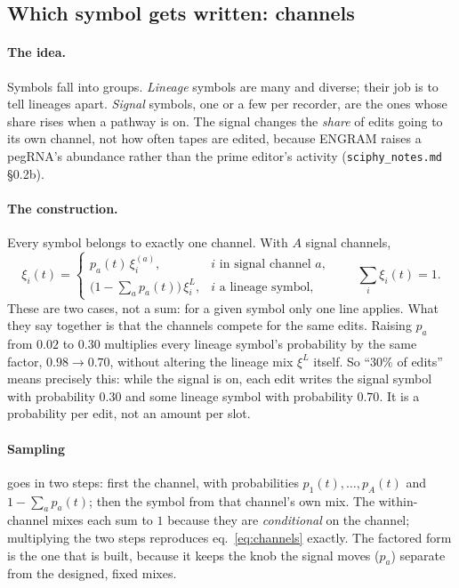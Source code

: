 \subsection{Which symbol gets written: channels}\label{sec:channels}

\paragraph{The idea.} Symbols fall into groups. \emph{Lineage} symbols are many and diverse; their job
is to tell lineages apart. \emph{Signal} symbols, one or a few per recorder, are the ones whose share
rises when a pathway is on. The signal changes the \emph{share} of edits going to its own channel, not
how often tapes are edited, because ENGRAM raises a pegRNA's abundance rather than the prime editor's
activity (\texttt{sciphy\_notes.md} \S0.2b).

\paragraph{The construction.} Every symbol belongs to exactly one channel. With $A$ signal channels,
\begin{equation}
  \xi_i(t)=
  \begin{cases}
    p_a(t)\,\xi^{(a)}_i, & i \text{ in signal channel } a,\\[3pt]
    \Big(1-\sum_a p_a(t)\Big)\,\xi^{L}_i, & i \text{ a lineage symbol,}
  \end{cases}
  \qquad \sum_i \xi_i(t)=1 .
  \label{eq:channels}
\end{equation}
These are two cases, not a sum: for a given symbol only one line applies. What they say together is
that the channels compete for the same edits. Raising $p_a$ from $0.02$ to $0.30$ multiplies every
lineage symbol's probability by the same factor, $0.98\to0.70$, without altering the lineage mix
$\xi^L$ itself. So ``$30\%$ of edits'' means precisely this: while the signal is on, each edit writes
the signal symbol with probability $0.30$ and some lineage symbol with probability $0.70$. It is a
probability per edit, not an amount per slot.

\paragraph{Sampling} goes in two steps: first the channel, with probabilities $p_1(t),\dots,p_A(t)$
and $1-\sum_a p_a(t)$; then the symbol from that channel's own mix. The within-channel mixes each sum
to $1$ because they are \emph{conditional} on the channel; multiplying the two steps reproduces
eq.~\eqref{eq:channels} exactly. The factored form is the one that is built, because it keeps the knob
the signal moves ($p_a$) separate from the designed, fixed mixes.

